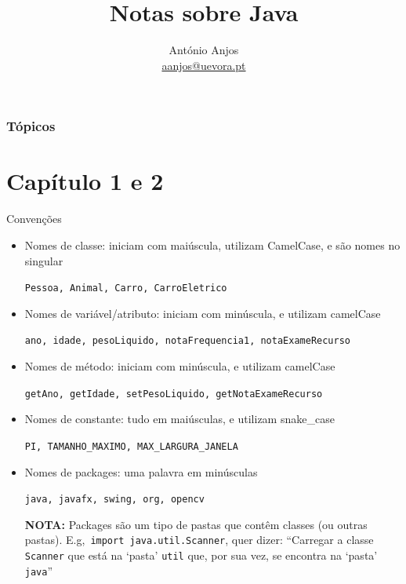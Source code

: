 \documentclass[portuguese, aspectratio=169, xcolor=table]{beamer}
\title[Java]{Notas sobre Java}
\author[António Anjos] %
{António Anjos\\\url{aanjos@uevora.pt}}
\institute[UÉ] %
{
    Departamento de Informática\\
    Universidade de Évora
}
\begin{document}
    \frame{\titlepage}
    
    
    \begin{frame}
        \frametitle{Tópicos}
        \tableofcontents
    \end{frame}
    
    
    
    


\section{Capítulo 1 e 2}

\begin{frame}{Convenções}
\begin{itemize}
        \item Nomes de classe: iniciam com maiúscula, utilizam CamelCase, e são nomes no singular

\hspace{0.25cm}\texttt{Pessoa, Animal, Carro, CarroEletrico}

    \item Nomes de variável/atributo: iniciam com minúscula, e utilizam camelCase

    \hspace{0.25cm}\texttt{ano, idade, pesoLiquido, notaFrequencia1, notaExameRecurso}

    \item Nomes de método: iniciam com minúscula, e utilizam camelCase

        \hspace{0.25cm}\texttt{getAno, getIdade, setPesoLiquido, getNotaExameRecurso}

    \item Nomes de constante: tudo em maiúsculas, e utilizam snake\_case

        \hspace{0.25cm}\texttt{PI, TAMANHO\_MAXIMO, MAX\_LARGURA\_JANELA}
\item Nomes de packages: uma palavra em minúsculas

\hspace{0.25cm}\texttt{java, javafx, swing, org, opencv}
\vspace{0.15cm}

\scriptsize \textbf{NOTA:} Packages são um tipo de pastas que contêm classes (ou outras pastas). E.g,\ \texttt{import java.util.Scanner}, quer dizer: ``Carregar a classe \texttt{Scanner} que está na `pasta' \texttt{util} que, por sua vez, se encontra na `pasta' \texttt{java}''
\end{itemize}
\end{frame}
\end{document}
